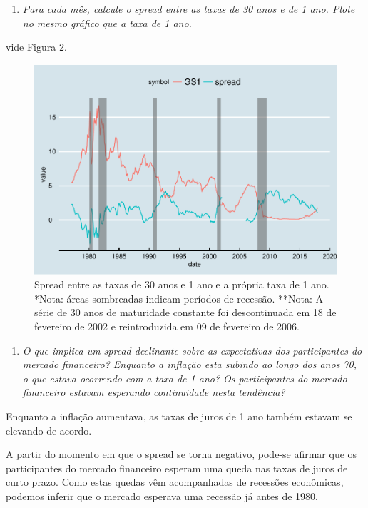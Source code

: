 \documentclass[]{article}
\providecommand{\tightlist}{%
  \setlength{\itemsep}{0pt}\setlength{\parskip}{0pt}}
\begin{document}
\begin{enumerate}
\def\labelenumi{\alph{enumi}.}
\setcounter{enumi}{2}
\tightlist
\item
  \emph{Para cada mês, calcule o spread entre as taxas de 30 anos e de 1
  ano. Plote no mesmo gráfico que a taxa de 1 ano.}
\end{enumerate}

vide Figura 2.

\begin{figure}
\centering
\includegraphics{Blanchar08-cap15_files/figure-latex/c_ggplot-1.pdf}
\caption{Spread entre as taxas de 30 anos e 1 ano e a própria taxa de 1
ano. *Nota: áreas sombreadas indicam períodos de recessão. **Nota: A
série de 30 anos de maturidade constante foi descontinuada em 18 de
fevereiro de 2002 e reintroduzida em 09 de fevereiro de 2006.}
\end{figure}

\begin{enumerate}
\def\labelenumi{\alph{enumi}.}
\setcounter{enumi}{3}
\tightlist
\item
  \emph{O que implica um spread declinante sobre as expectativas dos
  participantes do mercado financeiro? Enquanto a inflação esta subindo
  ao longo dos anos 70, o que estava ocorrendo com a taxa de 1 ano? Os
  participantes do mercado financeiro estavam esperando continuidade
  nesta tendência?}
\end{enumerate}

Enquanto a inflação aumentava, as taxas de juros de 1 ano também estavam
se elevando de acordo.

A partir do momento em que o spread se torna negativo, pode-se afirmar
que os participantes do mercado financeiro esperam uma queda nas taxas
de juros de curto prazo. Como estas quedas vêm acompanhadas de recessões
econômicas, podemos inferir que o mercado esperava uma recessão já antes
de 1980.
\end{document}

